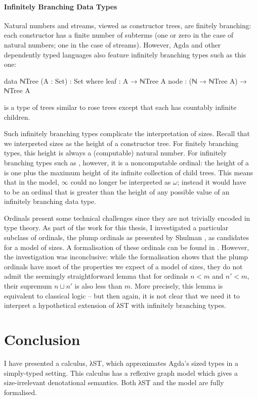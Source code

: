 \paragraph{Infinitely Branching Data Types}

Natural numbers and streams, viewed as constructor trees, are finitely
branching: each constructor has a finite number of subterms (one or zero in the
case of natural numbers; one in the case of streams). However, Agda and other
dependently typed languages also feature infinitely branching types such as this
one:
\begin{code}
  data ℕTree (A : Set) : Set where
    leaf : A → ℕTree A
    node : (ℕ → ℕTree A) → ℕTree A
\end{code}
 is a type of trees similar to rose trees except that each
 has countably infinite children.

Such infinitely branching types complicate the interpretation of sizes. Recall
that we interpreted sizes as the height of a constructor tree. For finitely
branching types, this height is always a (computable) natural number. For
infinitely branching types such as , however, it is a noncomputable
ordinal: the height of a  is one plus the maximum height of its
infinite collection of child trees. This means that in the model, $∞$ could no
longer be interpreted as $ω$; instead it would have to be an ordinal that is
greater than the height of any possible value of an infinitely branching data
type.

Ordinals present some technical challenges since they are not trivially encoded
in type theory. As part of the work for this thesis, I investigated a particular
subclass of ordinals, the plump ordinals \cite{taylor1996} as presented by
Shulman \cite{shulman2014}, as candidates for a model of sizes. A formalisation
of these ordinals can be found in . However, the investigation was inconclusive: while
the formalisation shows that the plump ordinals have most of the properties we
expect of a model of sizes, they do not admit the seemingly straightforward
lemma that for ordinals $n < m$ and $n′ < m$, their supremum $n ⊔ n′$ is also
less than $m$. More precisely, this lemma is equivalent to classical logic --
but then again, it is not clear that we need it to interpret a hypothetical
extension of λST with infinitely branching types.


\section{Conclusion}
\label{sec:conclusion:conclusion}

I have presented a calculus, λST, which approximates Agda's sized types in a
simply-typed setting. This calculus has a reflexive graph model which gives a
size-irrelevant denotational semantics. Both λST and the model are fully
formalised.
